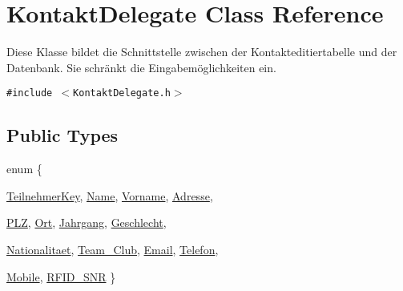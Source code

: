 \hypertarget{class_kontakt_delegate}{
\section{KontaktDelegate Class Reference}
\label{class_kontakt_delegate}
}
Diese Klasse bildet die Schnittstelle zwischen der Kontakteditiertabelle und der Datenbank. Sie schränkt die Eingabemöglichkeiten ein.  


{\tt \#include $<$KontaktDelegate.h$>$}

\subsection*{Public Types}
\begin{CompactItemize}
\item 
enum \{ \par
\hyperlink{class_kontakt_delegate_fc7afbf9a00884adacdccdfd06ffc7a35c43e85ebe5c19ed5b4140e829db5bbc}{TeilnehmerKey}, 
\hyperlink{class_kontakt_delegate_fc7afbf9a00884adacdccdfd06ffc7a32e05aa3cadcf486b4247200f8543a91d}{Name}, 
\hyperlink{class_kontakt_delegate_fc7afbf9a00884adacdccdfd06ffc7a3e1cdd5d7579ed0053fc8dfadeeec4c6e}{Vorname}, 
\hyperlink{class_kontakt_delegate_fc7afbf9a00884adacdccdfd06ffc7a3df66cc5f1321774e64677acbf9238f8b}{Adresse}, 
\par
\hyperlink{class_kontakt_delegate_fc7afbf9a00884adacdccdfd06ffc7a3c9b949882ef0ee828256aab760643083}{PLZ}, 
\hyperlink{class_kontakt_delegate_fc7afbf9a00884adacdccdfd06ffc7a3254bbd500b3a141f3a819d4222210979}{Ort}, 
\hyperlink{class_kontakt_delegate_fc7afbf9a00884adacdccdfd06ffc7a30f385c9da3ab92021cb4e1f53b2471c3}{Jahrgang}, 
\hyperlink{class_kontakt_delegate_fc7afbf9a00884adacdccdfd06ffc7a3478ab7baf704b8be026c2fd6acaa5fef}{Geschlecht}, 
\par
\hyperlink{class_kontakt_delegate_fc7afbf9a00884adacdccdfd06ffc7a3dd939c5c1e3a420c955f9b6967baeaae}{Nationalitaet}, 
\hyperlink{class_kontakt_delegate_fc7afbf9a00884adacdccdfd06ffc7a3069f28c6ebea26c8f657fe6e94eeb2bf}{Team\_\-Club}, 
\hyperlink{class_kontakt_delegate_fc7afbf9a00884adacdccdfd06ffc7a32f182224117f5e5ef4c55bb086d7f47d}{Email}, 
\hyperlink{class_kontakt_delegate_fc7afbf9a00884adacdccdfd06ffc7a31eb4c57cff8ec4138bcd0409a136ccc3}{Telefon}, 
\par
\hyperlink{class_kontakt_delegate_fc7afbf9a00884adacdccdfd06ffc7a32084ea40573bc29804b7f92f6fe6f522}{Mobile}, 
\hyperlink{class_kontakt_delegate_fc7afbf9a00884adacdccdfd06ffc7a31b49488741e98d66eacca2bcd21395ef}{RFID\_\-SNR}
 \}
\end{CompactItemize}
